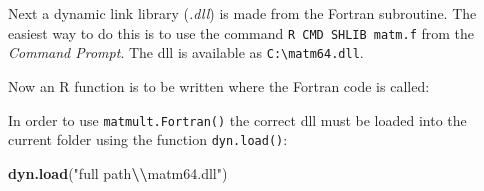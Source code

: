 \documentclass[
]{book}
\newenvironment{Shaded}{\begin{snugshade}}{\end{snugshade}}
\newcommand{\AttributeTok}[1]{\textcolor[rgb]{0.13,0.29,0.53}{#1}}
\newcommand{\ControlFlowTok}[1]{\textcolor[rgb]{0.13,0.29,0.53}{\textbf{#1}}}
\newcommand{\DecValTok}[1]{\textcolor[rgb]{0.00,0.00,0.81}{#1}}
\newcommand{\FunctionTok}[1]{\textcolor[rgb]{0.13,0.29,0.53}{\textbf{#1}}}
\newcommand{\NormalTok}[1]{#1}
\newcommand{\OtherTok}[1]{\textcolor[rgb]{0.56,0.35,0.01}{#1}}
\newcommand{\SpecialCharTok}[1]{\textcolor[rgb]{0.81,0.36,0.00}{\textbf{#1}}}
\newcommand{\StringTok}[1]{\textcolor[rgb]{0.31,0.60,0.02}{#1}}
\begin{document}
Next a dynamic link library (\emph{{.dll}}) is made from the Fortran subroutine. The easiest way to do this is to use the command \texttt{R\ CMD\ SHLIB\ matm.f} from the \emph{{Command Prompt}}. The dll is available as \texttt{C:\textbackslash{}matm64.dll}.

Now an R function is to be written where the Fortran code is called:

\begin{Shaded}
\end{Shaded}

In order to use \texttt{matmult.Fortran()} the correct dll must be loaded into the current folder using the function \texttt{dyn.load()}:

\begin{Shaded}
\begin{Highlighting}[]
\FunctionTok{dyn.load}\NormalTok{(}\StringTok{"full path}\SpecialCharTok{\textbackslash{}\textbackslash{}}\StringTok{matm64.dll"}\NormalTok{)}
\end{Highlighting}
\end{Shaded}
\end{document}
